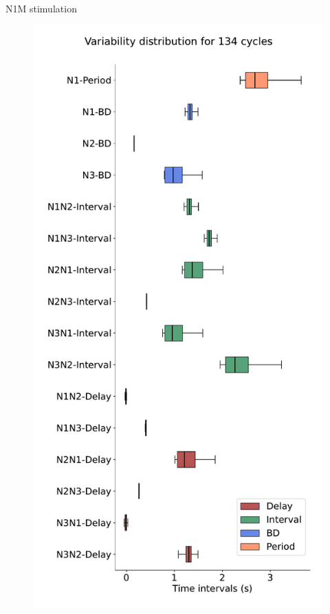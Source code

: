 \documentclass[aspectratio=43]{beamer}
\begin{document}
\begin{frame}{N1M stimulation}
	\begin{figure}[hbt!]
		\begin{minipage}[b]{0.36\textwidth}
			\centering
			\includegraphics[width=\textwidth]{invariants/data/MODEL/n1m_driven/images/3phases/_boxplot.pdf}

\end{minipage}
\end{figure}
\end{frame}
\end{document}
